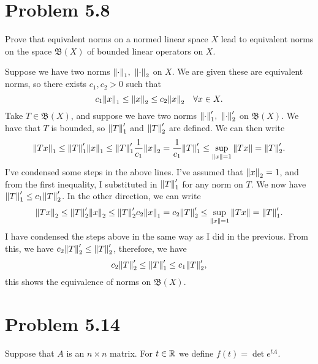 \section{Problem 5.8}
Prove that equivalent norms on a normed linear space $X$ lead to equivalent norms on the space $\mathfrak{B}(X)$ of bounded linear operators on $X$.
\partbreak
\begin{solution}

    Suppose we have two norms $\norm{\cdot}_1, \ \norm{\cdot}_2$ on $X$. We are given these are equivalent norms, so there exists $c_1, c_2 > 0$ such that 
    \[c_1\norm{x}_1 \leq \norm{x}_2 \leq c_2\norm{x}_2 \quad \forall x \in X.\]
    Take $T \in \mathfrak{B}(X)$, and suppose we have two norms $\norm{\cdot}_1', \ \norm{\cdot}_2'$ on $\mathfrak{B}(X)$. We have that $T$ is bounded, so $\norm{T}_1'$ and $\norm{T}_2'$ are defined. We can then write
    \[\norm{Tx}_1 \leq \norm{T}_1' \norm{x}_1 \leq \norm{T}_1' \frac{1}{c_1}\norm{x}_2 = \frac{1}{c_1}\norm{T}_1' \leq \sup_{\norm{x} = 1}\norm{Tx} = \norm{T}_2'.\]
    I've condensed some steps in the above lines. I've assumed that $\norm{x}_2 = 1$, and from the first inequality, I substituted in $\norm{T}_1'$ for any norm on $T$. We now have $\norm{T}_1' \leq c_1\norm{T}_2'$. In the other direction, we can write
    \[\norm{Tx}_2 \leq \norm{T}_2'\norm{x}_2 \leq \norm{T}_2' c_2\norm{x}_1 = c_2\norm{T}_2' \leq \sup_{\norm{x} = 1}\norm{Tx} = \norm{T}_1'.\]
    I have condensed the steps above in the same way as I did in the previous. From this, we have $c_2\norm{T}_2' \leq \norm{T}_2'$, therefore, we have 
    \[c_2\norm{T}_2' \leq \norm{T}_1' \leq c_1\norm{T}_2',\]
    this shows the equivalence of norms on $\mathfrak{B}(X)$.
\end{solution}
\newpage
\section{Problem 5.14}
Suppose that $A$ is an $n \times n$ matrix. For $t \in \mathbb{R}$ we define $f(t) = \det e^{tA}$.
